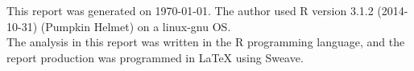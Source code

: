\documentclass[11pt]{article}
\begin{document}
This report was generated on \today.  The author used R version 3.1.2 (2014-10-31) (Pumpkin Helmet) on a linux-gnu OS.  \\

The analysis in this report was written in the R programming language, and the report production was programmed in \LaTeX{} using Sweave.\\


% 
% 
\end{document}
